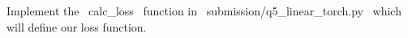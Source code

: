\item {}
Implement the ~calc_loss~ function in ~submission/q5_linear_torch.py~ which will define our loss function.